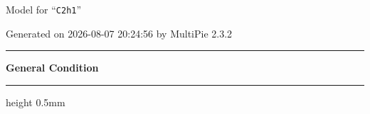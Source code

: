 \documentclass[fleqn,10pt,landscape]{jsarticle}
\begin{document}
\setcounter{MaxMatrixCols}{32}

\renewcommand{\tablename}{Table~}
\renewcommand{\figurename}{Figure~}
\setlength{\baselineskip}{16pt}
\setlength{\parindent}{0pt}
\setlength{\mathindent}{0pt}
\footnotesize
\begin{center}
\LARGE
Model for ``\texttt{C2h1}''
\end{center}
\begin{flushright}
Generated on 2026-08-07 20:24:56 by MultiPie 2.3.2
\end{flushright}
\setlength{\baselineskip}{16pt}
\footnotesize
\vspace{5mm}
\noindent \rule[0.5mm]{5mm}{0.5mm}\hspace{3mm}\textbf{General Condition}\hspace{3mm}\leaders\hrule height 0.5mm\hfill\kern0pt
\vspace{3mm}
\end{document}
